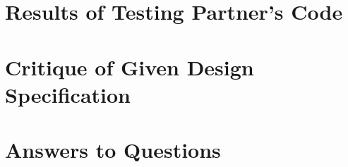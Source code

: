 \documentclass[12pt]{article}
\begin{document}
\section{Results of Testing Partner's Code}


\section{Critique of Given Design Specification}



\section{Answers to Questions}

\begin{enumerate}[(a)]


\end{enumerate}
\end{document}
